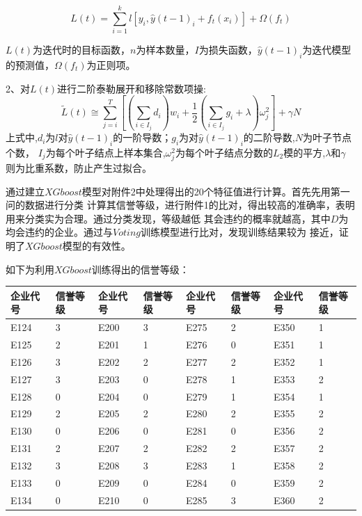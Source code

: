 \documentclass[UTF8]{ctexart}
\begin{document}
		\begin{equation}
			L(t)=\sum_{i = 1}^{k}l[y_i,\hat{y}(t-1)_i+f_t(x_i)]+\Omega (f_t)  
		\end{equation}

		$L(t)$为迭代时的目标函数，$n$为样本数量，$I$为损失函数，$\hat{y}(t-1)_i$为迭代模型的预测值，$\Omega (f_t)$为正则项。
	
	2、对$L(t)$进行二阶泰勒展开和移除常数项操:
	\begin{equation}
		\tilde{L}(t) \cong \sum_{j=i}^T[(\sum_{i\in I_j}d_i)w_i+\frac{1}{2}(\sum_{i\in I_j}g_i+\lambda )\omega ^2_j]+\gamma N  
	\end{equation}
	上式中,$d_i$为$l$对$\hat{y}(t-1)_i$的一阶导数；$g_i$为对$\hat{y}(t-1)_i$的二阶导数,$N$为叶子节点个数，
	$I_j$为每个叶子结点上样本集合,$\omega ^2_j$为每个叶子结点分数的$L_2$模的平方,$\lambda$和$\gamma$
	则为比重系数，防止产生过拟合。

	通过建立$XGboost$模型对附件2中处理得出的20个特征值进行计算。首先先用第一问的数据进行分类
	计算其信誉等级，进行附件1的比对，得出较高的准确率，表明用来分类实为合理。通过分类发现，等级越低
	其会违约的概率就越高，其中$D$为均会违约的企业。通过与$Voting$训练模型进行比对，发现训练结果较为
	接近，证明了$XGboost$模型的有效性。

	如下为利用$XGboost$训练得出的信誉等级：
	\begin{table}[H]
		\centering
		\begin{tabular}{|l|l|l|l|l|l|l|l|}
		\hline
			企业代号 & 信誉等级 & 企业代号 & 信誉等级 & 企业代号 & 信誉等级 & 企业代号 & 信誉等级 \\ \hline
			E124 & 3 & E200 & 3 & E275 & 2 & E350 & 1 \\ \hline
			E125 & 2 & E201 & 1 & E276 & 0 & E351 & 1 \\ \hline
			E126 & 3 & E202 & 2 & E277 & 2 & E352 & 1 \\ \hline
			E127 & 3 & E203 & 0 & E278 & 1 & E353 & 2 \\ \hline
			E128 & 0 & E204 & 0 & E279 & 1 & E354 & 1 \\ \hline
			E129 & 2 & E205 & 2 & E280 & 2 & E355 & 2 \\ \hline
			E130 & 0 & E206 & 0 & E281 & 0 & E356 & 2 \\ \hline
			E131 & 2 & E207 & 2 & E282 & 2 & E357 & 2 \\ \hline
			E132 & 3 & E208 & 3 & E283 & 1 & E358 & 2 \\ \hline
			E133 & 0 & E209 & 0 & E284 & 0 & E359 & 2 \\ \hline
			E134 & 0 & E210 & 0 & E285 & 3 & E360 & 2 \\ \hline
		\end{tabular}
	\end{table}
\end{document}
